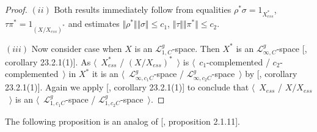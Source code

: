 \begin{proof}
$(ii)$ Both results immediately follow from equalities
$\rho^*\sigma=1_{X_{ess}^*}$, $\tau \pi^*=1_{{(X/X_{ess})}^*}$ and estimates
$\Vert \rho^*\Vert\Vert \sigma\Vert\leq c_1$, 
$\Vert\tau\Vert\Vert \pi^*\Vert\leq c_2$.

$(iii)$ Now consider case when $X$ is an $\mathscr{L}_{1,C}^g$-space. Then $X^*$
is an $\mathscr{L}_{\infty,C}^g$-space [\cite{DefFloTensNorOpId}, corollary
23.2.1(1)]. As $\langle$~$X_{ess}^*$ / ${(X/X_{ess})}^*$~$\rangle$ is
$\langle$~$c_1$-complemented / $c_2$-complemented~$\rangle$ in $X^*$ it is an
$\langle$~$\mathscr{L}_{\infty,c_1C}^g$-space /
$\mathscr{L}_{\infty,c_2C}^g$-space~$\rangle$ by [\cite{DefFloTensNorOpId},
corollary 23.2.1(1)]. Again we apply [\cite{DefFloTensNorOpId}, corollary
23.2.1(1)] to conclude that $\langle$~$X_{ess}$  / $X/X_{ess}$~$\rangle$ is an
$\langle$~$\mathscr{L}_{1,c_1C}^g$-space /
$\mathscr{L}_{1,c_2C}^g$-space~$\rangle$.
\end{proof}

The following proposition is an analog 
of [\cite{RamsHomPropSemgroupAlg}, proposition 2.1.11].

